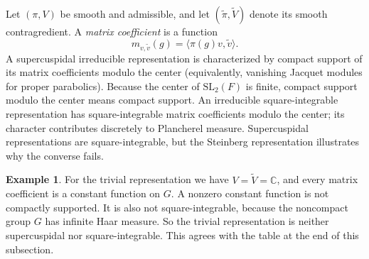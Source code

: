 \documentclass[12pt,letterpaper]{amsart}
\numberwithin{equation}{section}
\theoremstyle{definition}
\newtheorem*{example*}{Example}
\theoremstyle{remark}
\begin{document}
Let $(\pi,V)$ be smooth and admissible, and let $(\widetilde\pi,\widetilde V)$ denote its smooth contragredient.  A \emph{matrix coefficient} is a function
\[
m_{v,\widetilde v}(g)=\langle\pi(g)v,\widetilde v\rangle.
\]
A supercuspidal irreducible representation is characterized by compact support of its matrix coefficients modulo the center (equivalently, vanishing Jacquet modules for proper parabolics). Because the center of $\mathrm{SL}_2(F)$ is finite, compact support modulo the center means compact support.  An irreducible square-integrable representation has square-integrable matrix coefficients modulo the center; its character contributes discretely to Plancherel measure.  Supercuspidal representations are square-integrable, but the Steinberg representation illustrates why the converse fails.
\begin{example*}
For the trivial representation we have $V=\widetilde V=\mathbb C$, and every matrix coefficient is a constant function on $G$. A nonzero constant function is not compactly supported. It is also not square-integrable, because the noncompact group $G$ has infinite Haar measure. So the trivial representation is neither supercuspidal nor square-integrable. This agrees with the table at the end of this subsection.
\end{example*}
\end{document}
